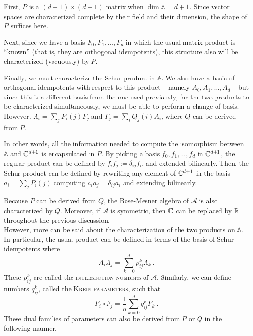 \documentclass{report}
\newcommand{\AS}{\mathcal{A}}
\newcommand{\BMA}{\mathbb{A}}
\begin{document}
      First, $P$ is a $(d+1) \times (d+1)$ matrix when $\dim \BMA = d+1$.  Since
      vector spaces are characterized complete by their field and their
      dimension, the shape of $P$ suffices here.

      Next, since we have a basis $F_0, F_1, \ldots, F_d$ in which the usual
      matrix product is ``known'' (that is, they are orthogonal idempotents),
      this structure also will be characterized (vacuously) by $P$.

      Finally, we must characterize the Schur product in $\BMA$.  We also have a
      basis of orthogonal idempotents with respect to this product -- namely
      $A_0, A_1, \ldots, A_d$ -- but since this is a different basis from the
      one used previously, for the two products to be characterized
      simultaneously, we must be able to perform a change of basis.  However,
      $A_i = \sum_j P_i(j) F_j$ and $F_j = \sum_i Q_j(i) A_i$,
      where $Q$ can be derived from $P$.

      In other words, all the information needed to compute the isomorphism
      between $\BMA$ and $\mathbb{C}^{d+1}$ is encapsulated in $P$.  By picking a basis
      $f_0, f_1, \ldots, f_d$ in $\mathbb{C}^{d+1}$, the regular product can be defined
      by $f_i f_j := \delta_{ij} f_i$, and extended bilinearly.  Then, the Schur
      product can be defined by rewriting any element of $\mathbb{C}^{d+1}$ in the basis
      $a_i = \sum_j P_i(j)$ computing $a_i a_j = \delta_{ij} a_i$ and extending
      bilinearly.

      Because $P$ can be derived from $Q$, the Bose-Mesner algebra of $\AS$ is
      also characterized by $Q$.  Moreover, if $\AS$ is symmetric, then $\mathbb{C}$ can
      be replaced by $\mathbb{R}$ throughout the previous discussion.
      \\

      However, more can be said about the characterization of the two products
      on $\BMA$.  In particular, the usual product can be defined in terms of
      the basis of Schur idempotents where
      $$
        A_i A_j = \sum_{k=0}^d p_{ij}^k A_k \ .
      $$
      These $p_{ij}^k$ are called the \textsc{intersection numbers} of $\AS$.
      Similarly, we can define numbers $q_{ij}^k$, called the \textsc{Krein
      parameters}, such that
      $$
        F_i \circ F_j = \frac{1}{n} \sum_{k=0}^d q_{ij}^k F_k \ .
      $$
      These dual families of parameters can also be derived from $P$ or $Q$ in
      the following manner.
\end{document}
